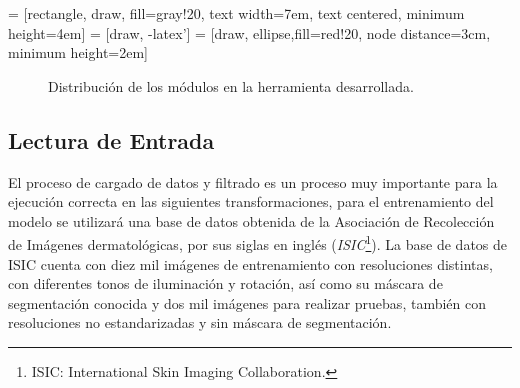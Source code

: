  = [rectangle, draw, fill=gray!20, 
    text width=7em, text centered, minimum height=4em]
 = [draw, -latex']
 = [draw, ellipse,fill=red!20, node distance=3cm,
    minimum height=2em]

\begin{figure}[H]
    \centering
    \caption{Distribución de los módulos en la herramienta desarrollada.}
    \label{fig: modules}
\end{figure}

\subsection{Lectura de Entrada}
El proceso de cargado de datos y filtrado es un proceso muy importante para la ejecución correcta en las siguientes transformaciones, para el entrenamiento del modelo se utilizará una base de datos obtenida de la Asociación de Recolección de Imágenes dermatológicas, por sus siglas en inglés (\emph{ISIC}\footnote{ISIC: International Skin Imaging Collaboration.}). La base de datos de ISIC cuenta con diez mil imágenes de entrenamiento con resoluciones distintas, con diferentes tonos de iluminación y rotación, así como su máscara de segmentación conocida y dos mil imágenes para realizar pruebas, también con resoluciones no estandarizadas y sin máscara de segmentación.



